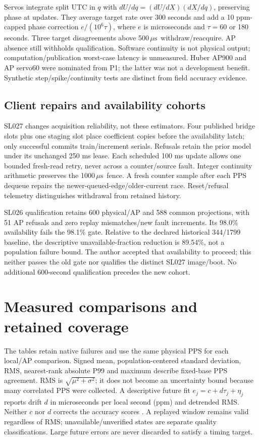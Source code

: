 \documentclass[10pt,letterpaper]{article}
\newcommand{\us}{\ensuremath{\,\mu\mathrm{s}}}
\begin{document}
Servos integrate split UTC in $q$ with $dU/dq=(dU/dX)(dX/dq)$, preserving phase
at updates. They average target rate over 300 seconds and add a 10 ppm-capped
phase correction $e/(10^6\tau)$, where $e$ is microseconds and $\tau=60$ or 180
seconds. Three target disagreements above 500\us\ withdraw/reacquire. AP absence
still withholds qualification. Software continuity is not physical output;
computation/publication worst-case latency is unmeasured. Huber AP900 and AP
servo60 were nominated from P1; the latter was not a development benefit.
Synthetic step/spike/continuity tests are distinct from field accuracy evidence.

\subsection{Client repairs and availability cohorts}
SL027 changes acquisition reliability, not these estimators. Four published
bridge slots plus one staging slot place coefficient copies before the
availability latch; only successful commits train/increment serials. Refusals
retain the prior model under its unchanged 250 ms lease. Each scheduled 100 ms
update allows one bounded fresh-read retry, never across a counter/source fault.
Integer continuity arithmetic preserves the 1000\us\ fence. A fresh counter
sample after each PPS dequeue repairs the newer-queued-edge/older-current race.
Reset/refusal telemetry distinguishes withdrawal from retained history.

SL026 qualification retains 600 physical/AP and 588 common projections, with
51 AP refusals and zero replay mismatches/new fault increments. Its 98.0\%
availability fails the 98.1\% gate. Relative to the declared historical 344/1799
baseline, the descriptive unavailable-fraction reduction is 89.54\%, not a
population failure bound. The author accepted that availability to proceed;
this neither passes the old gate nor qualifies the distinct SL027 image/boot.
No additional 600-second qualification precedes the new cohort.

\section{Measured comparisons and retained coverage}
The tables retain native failures and use the same physical PPS for each
local/AP comparison. Signed mean, population-centered standard deviation, RMS,
nearest-rank absolute P99 and maximum describe fixed-base PPS agreement. RMS is
$\sqrt{\mu^2+\sigma^2}$; it does not become an uncertainty bound because many
correlated PPS were collected. A descriptive future fit
$e_j=c+d\tau_j+\eta_j$ reports drift $d$ in microseconds per local second (ppm)
and detrended RMS. Neither $c$ nor $d$ corrects the accuracy scores
\citep{riley}.
A replayed window remains valid regardless of RMS; unavailable/unverified
states are separate quality classifications. Large future errors are never
discarded to satisfy a timing target.
\end{document}
